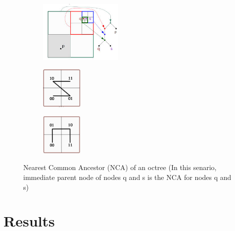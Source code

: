 \documentclass{sig-alternate}
\begin{document}
\begin{figure}[H]
\begin{subfigure}[h]{.45\columnwidth}
\includegraphics[height=30mm,keepaspectratio]{images/nca_2d.jpg}
\end{subfigure}
\hfill
\begin{subfigure}[h]{0.25\columnwidth}
\centering
\includegraphics[width=20mm,keepaspectratio]{images/zcell.png}
\end{subfigure}
\hfill
\begin{subfigure}[h]{0.25\columnwidth}
\centering
\includegraphics[width=20mm,keepaspectratio]{images/hilbertcell.png}
\end{subfigure}
\caption{Nearest Common Ancestor (NCA) of an octree (In this senario, immediate parent node of nodes q and s is the NCA for nodes q and s) \label{NCA}} 
\end{figure}

\section{Results}
\end{document}
